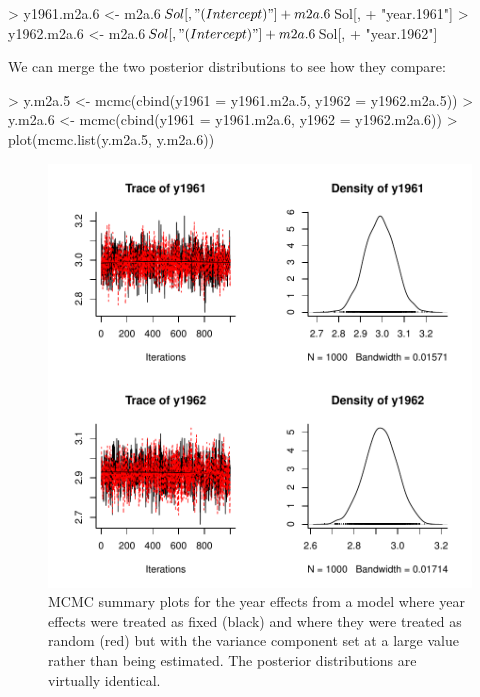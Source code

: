 \documentclass{article}
\begin{document}
\begin{Schunk}
\begin{Sinput}
> y1961.m2a.6 <- m2a.6$Sol[, "(Intercept)"] + m2a.6$Sol[, 
+     "year.1961"]
> y1962.m2a.6 <- m2a.6$Sol[, "(Intercept)"] + m2a.6$Sol[, 
+     "year.1962"]
\end{Sinput}
\end{Schunk}

We can merge the two posterior distributions to see how they compare:

\begin{Schunk}
\begin{Sinput}
> y.m2a.5 <- mcmc(cbind(y1961 = y1961.m2a.5, y1962 = y1962.m2a.5))
> y.m2a.6 <- mcmc(cbind(y1961 = y1961.m2a.6, y1962 = y1962.m2a.6))
> plot(mcmc.list(y.m2a.5, y.m2a.6))
\end{Sinput}
\end{Schunk}


\begin{figure}[!h]
\begin{center}
\includegraphics{Lecture2-050}
\end{center}
\caption{MCMC summary plots for the year effects from a model where year effects were treated as fixed (black) and where they were treated as random (red) but with the variance component set at a large value rather than being estimated. The posterior distributions are virtually identical.}
\label{y.pred-fig}
\end{figure}
\end{document}
